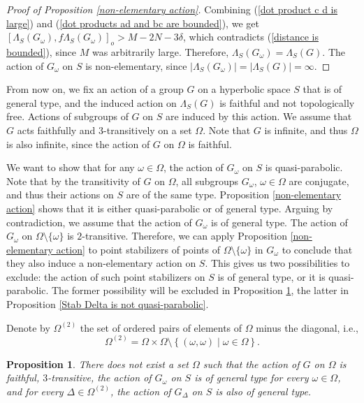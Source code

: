 \documentclass[11pt,letterpaper]{article}
\newtheorem{prop}[thm]{Proposition}
\theoremstyle{definition}
\theoremstyle{remark}
\begin{document}
\begin{proof}[Proof of Proposition \ref{non-elementary action}]
Combining (\ref{dot product c d is large}) and (\ref{dot products ad and bc are bounded}), we get $[\Lambda_S(G_\omega), f\Lambda_S(G_\omega)]_o > M-2N-3\delta$, which contradicts (\ref{distance is bounded}), since $M$ was arbitrarily large. Therefore, $\Lambda_S(G_\omega)=\Lambda_S(G)$. The action of $G_\omega$ on $S$ is non-elementary, since $|\Lambda_S(G_\omega)|=|\Lambda_S(G)|=\infty$. 
\end{proof}

From now on, we fix an action of a group $G$ on a hyperbolic space $S$ that is of general type, and the induced action on $\Lambda_S(G)$ is faithful and not topologically free. Actions of subgroups of $G$ on $S$ are induced by this action. We assume that $G$ acts faithfully and $3$-transitively on a set $\Omega$. Note that $G$ is infinite, and thus $\Omega$ is also infinite, since the action of $G$ on $\Omega$ is faithful.

We want to show that for any $\omega \in \Omega$, the action of $G_\omega$ on $S$ is quasi-parabolic. Note that by the transitivity of $G$ on $\Omega$, all subgroups $G_\omega$, $\omega \in \Omega$ are conjugate, and thus their actions on $S$ are of the same type. Proposition \ref{non-elementary action} shows that it is either quasi-parabolic or of general type. Arguing by contradiction, we assume that the action of $G_\omega$ is of general type. The action of $G_\omega$ on $\Omega \setminus \{\omega\}$ is $2$-transitive. Therefore, we can apply Proposition \ref{non-elementary action} to point stabilizers of points of $\Omega \setminus \{\omega\}$ in $G_\omega$ to conclude that they also induce a non-elementary action on $S$. This gives us two possibilities to exclude: the action of such point stabilizers on $S$ is of general type, or it is quasi-parabolic. The former possibility will be excluded in Proposition \ref{Stab Delta is not of general type}, the latter in Proposition \ref{Stab Delta is not quasi-parabolic}. 

Denote by $\Omega^{(2)}$ the set of ordered pairs of elements of $\Omega$ minus the diagonal, i.e.,
$$
\Omega^{(2)}= \Omega \times \Omega \setminus  \left \{ (\omega, \omega) \mid \omega \in \Omega \right \}.
$$

\begin{prop}\label{Stab Delta is not of general type}
    There does not exist a set $\Omega$ such that the action of $G$ on $\Omega$ is faithful, $3$-transitive, the action of $G_\omega$ on $S$ is of general type for every $\omega \in \Omega$, and for every $\Delta \in \Omega^{(2)}$, the action of $G_\Delta$ on $S$ is also of general type. 
\end{prop}
\end{document}
